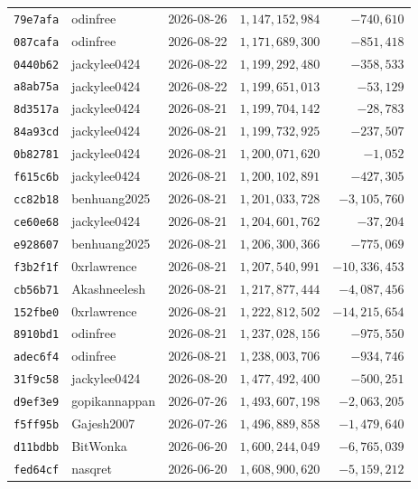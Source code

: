 {\begin{longtable}{@{}lllrr@{}}
\texttt{79e7afa} & odinfree & 2026-08-26 & $1{,}147{,}152{,}984$ & $-740{,}610$\\
\texttt{087cafa} & odinfree & 2026-08-22 & $1{,}171{,}689{,}300$ & $-851{,}418$\\
\texttt{0440b62} & jackylee0424 & 2026-08-22 & $1{,}199{,}292{,}480$ & $-358{,}533$\\
\texttt{a8ab75a} & jackylee0424 & 2026-08-22 & $1{,}199{,}651{,}013$ & $-53{,}129$\\
\texttt{8d3517a} & jackylee0424 & 2026-08-21 & $1{,}199{,}704{,}142$ & $-28{,}783$\\
\texttt{84a93cd} & jackylee0424 & 2026-08-21 & $1{,}199{,}732{,}925$ & $-237{,}507$\\
\texttt{0b82781} & jackylee0424 & 2026-08-21 & $1{,}200{,}071{,}620$ & $-1{,}052$\\
\texttt{f615c6b} & jackylee0424 & 2026-08-21 & $1{,}200{,}102{,}891$ & $-427{,}305$\\
\texttt{cc82b18} & benhuang2025 & 2026-08-21 & $1{,}201{,}033{,}728$ & $-3{,}105{,}760$\\
\texttt{ce60e68} & jackylee0424 & 2026-08-21 & $1{,}204{,}601{,}762$ & $-37{,}204$\\
\texttt{e928607} & benhuang2025 & 2026-08-21 & $1{,}206{,}300{,}366$ & $-775{,}069$\\
\texttt{f3b2f1f} & 0xrlawrence & 2026-08-21 & $1{,}207{,}540{,}991$ & $-10{,}336{,}453$\\
\texttt{cb56b71} & Akashneelesh & 2026-08-21 & $1{,}217{,}877{,}444$ & $-4{,}087{,}456$\\
\texttt{152fbe0} & 0xrlawrence & 2026-08-21 & $1{,}222{,}812{,}502$ & $-14{,}215{,}654$\\
\texttt{8910bd1} & odinfree & 2026-08-21 & $1{,}237{,}028{,}156$ & $-975{,}550$\\
\texttt{adec6f4} & odinfree & 2026-08-21 & $1{,}238{,}003{,}706$ & $-934{,}746$\\
\texttt{31f9c58} & jackylee0424 & 2026-08-20 & $1{,}477{,}492{,}400$ & $-500{,}251$\\
\texttt{d9ef3e9} & gopikannappan & 2026-07-26 & $1{,}493{,}607{,}198$ & $-2{,}063{,}205$\\
\texttt{f5ff95b} & Gajesh2007 & 2026-07-26 & $1{,}496{,}889{,}858$ & $-1{,}479{,}640$\\
\texttt{d11bdbb} & BitWonka & 2026-06-20 & $1{,}600{,}244{,}049$ & $-6{,}765{,}039$\\
\texttt{fed64cf} & nasqret & 2026-06-20 & $1{,}608{,}900{,}620$ & $-5{,}159{,}212$\\

\end{longtable}}
